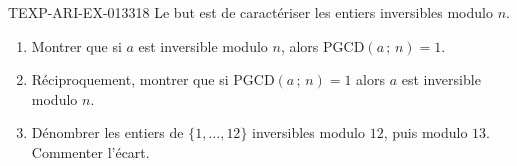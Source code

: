 \begin{exercice}{TEXP-ARI-EX-013}{3}{18}
Le but est de caractériser les entiers inversibles modulo $n$.
\begin{enumerate}
  \item Montrer que si $a$ est inversible modulo $n$, alors
        $\mathrm{PGCD}(a\,;\,n)=1$.
  \item Réciproquement, montrer que si $\mathrm{PGCD}(a\,;\,n)=1$ alors $a$ est
        inversible modulo $n$.
  \item Dénombrer les entiers de $\{1,\dots,12\}$ inversibles modulo $12$, puis
        modulo $13$. Commenter l'écart.
\end{enumerate}
\end{exercice}

